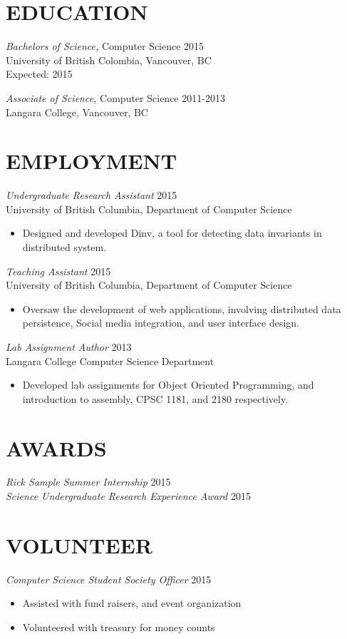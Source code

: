 \documentclass[line,margin]{res}
\begin{document}
\begin{resume}
\section{EDUCATION}
{\sl Bachelors of Science,} Computer Science	\hfill 2015\\
University of British Colombia, Vancouver, BC \\
Expected: 2015

{\sl Associate of Science,} Computer Science \hfill 2011-2013\\
Langara College, Vancouver, BC\\


\section{EMPLOYMENT} 
{\sl Undergraduate Research Assistant} \hfill 2015\\
	University of British Columbia, Department of Computer Science
\begin{itemize} \itemsep -2pt
        \item Designed and developed Dinv, a tool for detecting data invariants in distributed system.
    \end{itemize}
{\sl Teaching Assistant} \hfill 2015\\
	University of British Columbia, Department of Computer Science
\begin{itemize} \itemsep -2pt
		\item Oversaw the development of web applications, involving distributed data persistence, Social media integration, and user interface design.
	\end{itemize}
{\sl Lab Assignment Author} \hfill 2013\\
	Langara College Computer Science Department
	\begin{itemize} \itemsep -2pt
			\item Developed lab assignments for Object Oriented Programming, and introduction to assembly, CPSC 1181, and 2180 respectively.
	\end{itemize}

\section{AWARDS}
{\sl Rick Sample Summer Internship} \hfill 2015\\
{\sl Science Undergraduate Research Experience Award} \hfill 2015\\


\section{VOLUNTEER}
{\sl Computer Science Student Society Officer} \hfill 2015
    \begin{itemize}
        \item Assisted with fund raisers, and event organization
        \item Volunteered with treasury for money counts
    \end{itemize}


\end{resume}
\end{document}
